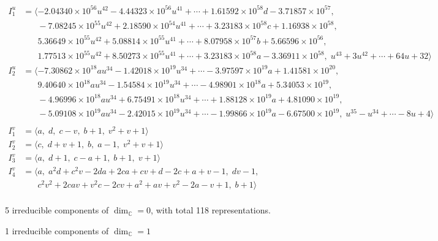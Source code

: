 \documentclass[1p]{elsarticle_modified}
\theoremstyle{definition}
\begin{document}
\begin{align*}
I^u_{1}&=\langle 
-2.04340\times10^{56} u^{42}-4.44323\times10^{56} u^{41}+\cdots+1.61592\times10^{58} d-3.71857\times10^{57},\\
\phantom{I^u_{1}}&\phantom{= \langle  }-7.08245\times10^{55} u^{42}+2.18590\times10^{54} u^{41}+\cdots+3.23183\times10^{58} c+1.16938\times10^{58},\\
\phantom{I^u_{1}}&\phantom{= \langle  }5.36649\times10^{55} u^{42}+5.08814\times10^{55} u^{41}+\cdots+8.07958\times10^{57} b+5.66596\times10^{56},\\
\phantom{I^u_{1}}&\phantom{= \langle  }1.77513\times10^{55} u^{42}+8.50273\times10^{55} u^{41}+\cdots+3.23183\times10^{58} a-3.36911\times10^{58},\;u^{43}+3 u^{42}+\cdots+64 u+32\rangle \\
I^u_{2}&=\langle 
-7.30862\times10^{18} a u^{34}-1.42018\times10^{19} u^{34}+\cdots-3.97597\times10^{19} a+1.41581\times10^{20},\\
\phantom{I^u_{2}}&\phantom{= \langle  }9.40640\times10^{18} a u^{34}-1.54584\times10^{19} u^{34}+\cdots-4.98901\times10^{18} a+5.34053\times10^{19},\\
\phantom{I^u_{2}}&\phantom{= \langle  }-4.96996\times10^{18} a u^{34}+6.75491\times10^{18} u^{34}+\cdots+1.88128\times10^{19} a+4.81090\times10^{19},\\
\phantom{I^u_{2}}&\phantom{= \langle  }-5.09108\times10^{19} a u^{34}-2.42015\times10^{19} u^{34}+\cdots-1.99866\times10^{19} a-6.67500\times10^{19},\;u^{35}- u^{34}+\cdots-8 u+4\rangle \\
\\
I^v_{1}&=\langle 
a,\;d,\;c- v,\;b+1,\;v^2+v+1\rangle \\
I^v_{2}&=\langle 
c,\;d+v+1,\;b,\;a-1,\;v^2+v+1\rangle \\
I^v_{3}&=\langle 
a,\;d+1,\;c- a+1,\;b+1,\;v+1\rangle \\
I^v_{4}&=\langle 
a,\;a^2 d+c^2 v-2 d a+2 c a+c v+d-2 c+a+v-1,\;d v-1,\\
\phantom{I^v_{4}}&\phantom{= \langle  }c^2 v^2+2 c a v+v^2 c-2 c v+a^2+a v+v^2-2 a- v+1,\;b+1\rangle \\
\end{align*}
\raggedright * 5 irreducible components of $\dim_{\mathbb{C}}=0$, with total 118 representations.\\
\raggedright * 1 irreducible components of $\dim_{\mathbb{C}}=1$ \\
\end{document}
